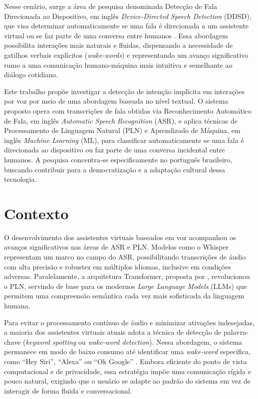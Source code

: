 \documentclass[
    12pt,                %
    openright,           %
    oneside,             %
    a4paper,             %
    english,             %
    brazil               %
]{abntex2}
\begin{document}
Nesse cenário, surge a área de pesquisa denominada Detecção de Fala Direcionada ao Dispositivo, em inglês \textit{Device-Directed Speech Detection} (DDSD), que visa determinar automaticamente se uma fala é direcionada a um assistente virtual ou se faz parte de uma conversa entre humanos \cite{Wagner2024}. Essa abordagem possibilita interações mais naturais e fluidas, dispensando a necessidade de gatilhos verbais explícitos (\textit{wake-words}) e representando um avanço significativo rumo a uma comunicação humano-máquina mais intuitiva e semelhante ao diálogo cotidiano.

Este trabalho propõe investigar a detecção de intenção implícita em interações por voz por meio de uma abordagem baseada no nível textual. O sistema proposto opera com transcrições de fala obtidas via Reconhecimento Automático de Fala, em inglês \textit{Automatic Speech Recognition} (ASR), e aplica técnicas de Processamento de Linguagem Natural (PLN) e Aprendizado de Máquina, em inglês \textit{Machine Learning} (ML), para classificar automaticamente se uma fala é direcionada ao dispositivo ou faz parte de uma conversa incidental entre humanos. A pesquisa concentra-se especificamente no português brasileiro, buscando contribuir para a democratização e a adaptação cultural dessa tecnologia.

\section{Contexto}
\label{sec:contexto}

O desenvolvimento dos assistentes virtuais baseados em voz acompanhou os avanços significativos nas áreas de ASR e PLN. Modelos como o Whisper \cite{Radford2023} representam um marco no campo do ASR, possibilitando transcrições de áudio com alta precisão e robustez em múltiplos idiomas, inclusive em condições adversas. Paralelamente, a arquitetura Transformer, proposta por , revolucionou o PLN, servindo de base para os modernos \textit{Large Language Models} (LLMs) que permitem uma compreensão semântica cada vez mais sofisticada da linguagem humana.

Para evitar o processamento contínuo de áudio e minimizar ativações indesejadas, a maioria dos assistentes virtuais atuais adota a técnica de detecção de palavra-chave (\textit{keyword spotting} ou \textit{wake-word detection}). Nessa abordagem, o sistema permanece em modo de baixo consumo até identificar uma \textit{wake-word} específica, como ``Hey Siri'', ``Alexa'' ou ``Ok Google'' \cite{Garg2021}. Embora eficiente do ponto de vista computacional e de privacidade, essa estratégia impõe uma comunicação rígida e pouco natural, exigindo que o usuário se adapte ao padrão do sistema em vez de interagir de forma fluida e conversacional.
\end{document}
